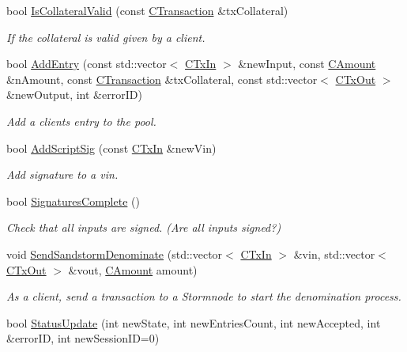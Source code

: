 \begin{DoxyCompactItemize}
bool \hyperlink{class_c_sandstorm_pool_aabecb7ff2cd77451de653fa23e01ccbe}{Is\+Collateral\+Valid} (const \hyperlink{class_c_transaction}{C\+Transaction} \&tx\+Collateral)
\begin{DoxyCompactList}\small\item\em If the collateral is valid given by a client. \end{DoxyCompactList}\item 
bool \hyperlink{class_c_sandstorm_pool_afeafad15214cd8599db468c2d9fc750e}{Add\+Entry} (const std\+::vector$<$ \hyperlink{class_c_tx_in}{C\+Tx\+In} $>$ \&new\+Input, const \hyperlink{amount_8h_a4eaf3a5239714d8c45b851527f7cb564}{C\+Amount} \&n\+Amount, const \hyperlink{class_c_transaction}{C\+Transaction} \&tx\+Collateral, const std\+::vector$<$ \hyperlink{class_c_tx_out}{C\+Tx\+Out} $>$ \&new\+Output, int \&error\+I\+D)
\begin{DoxyCompactList}\small\item\em Add a clients entry to the pool. \end{DoxyCompactList}\item 
bool \hyperlink{class_c_sandstorm_pool_a3a205b0af8f0b7d30c82c9b6f2f56573}{Add\+Script\+Sig} (const \hyperlink{class_c_tx_in}{C\+Tx\+In} \&new\+Vin)
\begin{DoxyCompactList}\small\item\em Add signature to a vin. \end{DoxyCompactList}\item 
bool \hyperlink{class_c_sandstorm_pool_a4b6bc55b02bfbce6a467507541a137bd}{Signatures\+Complete} ()
\begin{DoxyCompactList}\small\item\em Check that all inputs are signed. (Are all inputs signed?) \end{DoxyCompactList}\item 
void \hyperlink{class_c_sandstorm_pool_a359b61acf2b36be02c04b7401a7a67d6}{Send\+Sandstorm\+Denominate} (std\+::vector$<$ \hyperlink{class_c_tx_in}{C\+Tx\+In} $>$ \&vin, std\+::vector$<$ \hyperlink{class_c_tx_out}{C\+Tx\+Out} $>$ \&vout, \hyperlink{amount_8h_a4eaf3a5239714d8c45b851527f7cb564}{C\+Amount} amount)
\begin{DoxyCompactList}\small\item\em As a client, send a transaction to a Stormnode to start the denomination process. \end{DoxyCompactList}\item 
bool \hyperlink{class_c_sandstorm_pool_af272c7c4cb797a825b11d097da4cc59a}{Status\+Update} (int new\+State, int new\+Entries\+Count, int new\+Accepted, int \&error\+I\+D, int new\+Session\+I\+D=0)

\end{DoxyCompactItemize}
